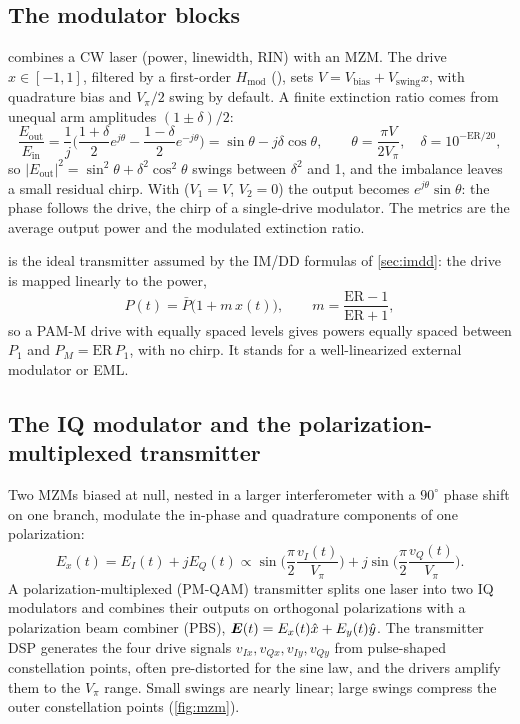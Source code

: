 \subsection{The modulator blocks}
 combines a CW laser (power, linewidth, RIN) with an MZM. The drive
$x\in[-1,1]$, filtered by a first-order $H_{\mathrm{mod}}$ (), sets
$V=V_{\mathrm{bias}}+V_{\mathrm{swing}}x$, with quadrature bias and $V_\pi/2$ swing by default. A finite extinction ratio
comes from unequal arm amplitudes $(1\pm\delta)/2$:
\begin{equation}
  \frac{E_{\mathrm{out}}}{E_{\mathrm{in}}}=\frac1j\Big(\frac{1+\delta}{2}e^{j\theta}-\frac{1-\delta}{2}e^{-j\theta}\Big)=\sin\theta-j\delta\cos\theta,
  \qquad \theta=\frac{\pi V}{2V_\pi},\quad \delta=10^{-\mathrm{ER}/20},
\end{equation}
so $|E_{\mathrm{out}}|^2=\sin^2\theta+\delta^2\cos^2\theta$ swings between $\delta^2$ and 1, and the imbalance leaves a
small residual chirp. With  ($V_1=V$, $V_2=0$) the output becomes
$e^{j\theta}\sin\theta$: the phase follows the drive, the chirp of a single-drive modulator. The metrics
are the average output power and the modulated extinction ratio.

 is the ideal transmitter assumed by the IM/DD formulas of
\cref{sec:imdd}: the drive is mapped linearly to the power,
\begin{equation}
  P(t)=\bar P\big(1+m\,x(t)\big),\qquad m=\frac{\mathrm{ER}-1}{\mathrm{ER}+1},
\end{equation}
so a PAM-M drive with equally spaced levels gives powers equally spaced between $P_1$ and
$P_M=\mathrm{ER}\,P_1$, with no chirp. It stands for a well-linearized external modulator or EML.

\subsection{The IQ modulator and the polarization-multiplexed transmitter}\label{sec:iq}
Two MZMs biased at null, nested in a larger interferometer with a $90^\circ$ phase shift on one
branch, modulate the in-phase and quadrature components of one polarization:
\begin{equation}
  E_x(t)=E_I(t)+jE_Q(t)\propto\sin\Big(\frac\pi2\frac{v_I(t)}{V_\pi}\Big)+j\sin\Big(\frac\pi2\frac{v_Q(t)}{V_\pi}\Big).
\end{equation}
A polarization-multiplexed (PM-QAM) transmitter splits one laser into two IQ modulators and
combines their outputs on orthogonal polarizations with a polarization beam combiner (PBS),
$\bm{E}(t)=E_x(t)\hat x+E_y(t)\hat y$. The transmitter DSP generates the four drive signals
$v_{Ix},v_{Qx},v_{Iy},v_{Qy}$ from pulse-shaped constellation points, often pre-distorted for the
sine law, and the drivers amplify them to the $V_\pi$ range. Small swings are nearly linear; large
swings compress the outer constellation points (\cref{fig:mzm}).

